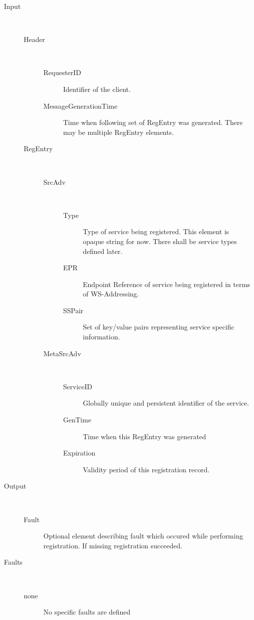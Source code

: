\documentclass{book}
\begin{document}
\begin{description}

  \item[Input]~\begin{description}
    \item[Header]~\begin{description}
      \item[RequesterID] Identifier of the client.
      \item[MessageGenerationTime] Time when following set of RegEntry was generated. There may be multiple RegEntry elements.
    \end{description}
    \item[RegEntry]~\begin{description}
      \item[SrcAdv]~\begin{description}
        \item[Type] Type of service being registered. This element is opaque string for now. There shall be service types defined later.
        \item[EPR] Endpoint Reference of service being registered in terms of WS-Addressing.
        \item[SSPair] Set of key/value pairs representing service specific information.
      \end{description}
      \item[MetaSrcAdv]~\begin{description}
        \item[ServiceID] Globally unique and persistent identifier of the service.
        \item[GenTime] Time when this RegEntry was generated
        \item[Expiration] Validity period of this registration record.
      \end{description}
    \end{description}
  \end{description}

  \item[Output]~\begin{description}
    \item[Fault] Optional element describing fault which occured while performing registration. If missing registration succeeded.
  \end{description}

  \item[Faults]~\begin{description}
    \item[none]No specific faults are defined
  \end{description}

\end{description}
\end{document}
